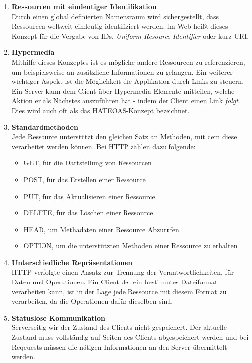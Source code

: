 \begin{enumerate}
	\item \textbf{Ressourcen mit eindeutiger Identifikation}\\
	Durch einen global definierten Namensraum wird sichergestellt, dass Ressourcen weltweit eindeutig identifiziert werden. Im Web heißt dieses Konzept für die Vergabe von IDs, \textit{Uniform Resource Identifier} oder kurz URI. 
	
	\item \textbf{Hypermedia}\\
	Mithilfe dieses Konzeptes ist es mögliche andere Ressourcen zu referenzieren, um beispielsweise an zusätzliche Informationen zu gelangen. Ein weiterer wichtiger Aspekt ist die Möglichkeit die Applikation durch Links zu steuern. Ein Server kann dem Client über Hypermedia-Elemente mitteilen, welche Aktion er als Nächstes auszuführen hat - indem der Client einen Link \textit{folgt}. Dies wird auch oft als das \acrfull{HATEOAS}-Konzept bezeichnet. 
	
	\item \textbf{Standardmethoden}\\
	Jede Ressource unterstützt den gleichen Satz an Methoden, mit dem diese verarbeitet werden können. Bei HTTP zählen dazu folgende:
	\begin{itemize}
		\item GET, für die Dartstellung von Ressourcen
		\item POST, für das Erstellen einer Ressource
		\item PUT, für das Aktualisieren einer Ressource
		\item DELETE, für das Löschen einer Ressource
		\item HEAD, um Methadaten einer Ressource Abzurufen
		\item OPTION, um die unterstützten Methoden einer Ressource zu erhalten
	\end{itemize}
	
	\item \textbf{Unterschiedliche Repräsentationen}\\
	HTTP verfolgte einen Ansatz zur Trennung der Verantwortlichkeiten, für Daten und Operationen. Ein Client der ein bestimmtes Dateiformat verarbeiten kann, ist in der Lage jede Ressource mit diesem Format zu verarbeiten, da die Operationen dafür dieselben sind. 
	
	\item \textbf{Statuslose Kommunikation}\\
	Serverseitig wir der Zustand des Clients nicht gespeichert. Der aktuelle Zustand muss vollständig auf Seiten des Clients abgespeichert werden und bei Reqeuests müssen die nötigen Informationen an den Server übermittelt werden.
	
\end{enumerate}

